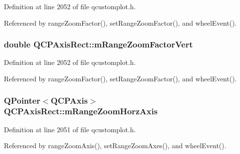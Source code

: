 Definition at line 2052 of file qcustomplot.\+h.



Referenced by range\+Zoom\+Factor(), set\+Range\+Zoom\+Factor(), and wheel\+Event().

\hypertarget{class_q_c_p_axis_rect_a32f063629581d5bf82b12769940b34ad}{}
\subsubsection[{m\+Range\+Zoom\+Factor\+Vert}]{\setlength{\rightskip}{0pt plus 5cm}double Q\+C\+P\+Axis\+Rect\+::m\+Range\+Zoom\+Factor\+Vert\hspace{0.3cm}{\ttfamily [protected]}}\label{class_q_c_p_axis_rect_a32f063629581d5bf82b12769940b34ad}


Definition at line 2052 of file qcustomplot.\+h.



Referenced by range\+Zoom\+Factor(), set\+Range\+Zoom\+Factor(), and wheel\+Event().

\hypertarget{class_q_c_p_axis_rect_ae22f882bab20518559f3fbb84243d0ab}{}
\subsubsection[{m\+Range\+Zoom\+Horz\+Axis}]{\setlength{\rightskip}{0pt plus 5cm}Q\+Pointer$<${\bf Q\+C\+P\+Axis}$>$ Q\+C\+P\+Axis\+Rect\+::m\+Range\+Zoom\+Horz\+Axis\hspace{0.3cm}{\ttfamily [protected]}}\label{class_q_c_p_axis_rect_ae22f882bab20518559f3fbb84243d0ab}


Definition at line 2051 of file qcustomplot.\+h.



Referenced by range\+Zoom\+Axis(), set\+Range\+Zoom\+Axes(), and wheel\+Event().

\hypertarget{class_q_c_p_axis_rect_a8b9acd16a203a9692bd35a9465f54bc1}{}
